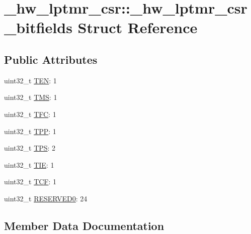 \hypertarget{struct__hw__lptmr__csr_1_1__hw__lptmr__csr__bitfields}{}\section{\+\_\+hw\+\_\+lptmr\+\_\+csr\+:\+:\+\_\+hw\+\_\+lptmr\+\_\+csr\+\_\+bitfields Struct Reference}
\label{struct__hw__lptmr__csr_1_1__hw__lptmr__csr__bitfields}
\subsection*{Public Attributes}
\begin{DoxyCompactItemize}
\item 
uint32\+\_\+t \hyperlink{struct__hw__lptmr__csr_1_1__hw__lptmr__csr__bitfields_ab3ca4cd105717797a3ed380b24601a62}{T\+EN}\+: 1
\item 
uint32\+\_\+t \hyperlink{struct__hw__lptmr__csr_1_1__hw__lptmr__csr__bitfields_af71e219e9b20c1a52b0fb7f6f33be135}{T\+MS}\+: 1
\item 
uint32\+\_\+t \hyperlink{struct__hw__lptmr__csr_1_1__hw__lptmr__csr__bitfields_afad29d33017eec2fb14f9f5734c3212b}{T\+FC}\+: 1
\item 
uint32\+\_\+t \hyperlink{struct__hw__lptmr__csr_1_1__hw__lptmr__csr__bitfields_ac836fbe76679c0618fc3572f65996b68}{T\+PP}\+: 1
\item 
uint32\+\_\+t \hyperlink{struct__hw__lptmr__csr_1_1__hw__lptmr__csr__bitfields_a2f00b1bd6d2cbdd98a67f03d42875306}{T\+PS}\+: 2
\item 
uint32\+\_\+t \hyperlink{struct__hw__lptmr__csr_1_1__hw__lptmr__csr__bitfields_ac2dfb0a3ba1598a61ef2d843d617b478}{T\+IE}\+: 1
\item 
uint32\+\_\+t \hyperlink{struct__hw__lptmr__csr_1_1__hw__lptmr__csr__bitfields_aef07386470b675bfd8d05a8ff3266ee8}{T\+CF}\+: 1
\item 
uint32\+\_\+t \hyperlink{struct__hw__lptmr__csr_1_1__hw__lptmr__csr__bitfields_a3652a75aae3c6ac094061a94a4c3cb0a}{R\+E\+S\+E\+R\+V\+E\+D0}\+: 24
\end{DoxyCompactItemize}


\subsection{Member Data Documentation}
